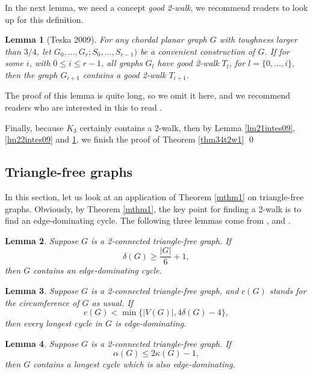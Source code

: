 \documentclass[12pt]{report}
\newtheorem{lemma}{Lemma}
\begin{document}
In the next lemma, we need a concept {\em good 2-walk}, we recommend readers to look up \cite[Lemma 2.2 and 2.3]{teska20092} for this definition.
\begin{lemma}[Teska 2009]\label{lm23intes09}
For any chordal planar graph $G$ with toughness larger than $3/4$, let $G_0,\ldots,G_r;S_0,\ldots,S_{r-1})$ be a  convenient construction of $G$. If for some $i$, with $0\le i\le r-1$, all graphs $G_l$ have good 2-walk $T_l$, for $l=\{0,\ldots,i\}$, then the graph $G_{i+1}$ contains a good 2-walk $T_{i+1}$. 
\end{lemma}
The proof of this lemma is quite long, so we omit it here, and we recommend readers who are interested in this to read \cite{teska20092}.

Finally, because $K_3$ certainly contains a 2-walk, then by Lemma \ref{lm21intes09}, \ref{lm22intes09} and \ref{lm23intes09}, we finish the proof of Theorem \ref{thm34t2w1}
\qed

\subsection{Triangle-free graphs}
In this section, let us look at an application of Theorem \ref{mthm1} on triangle-free graphs. Obviously, by Theorem \ref{mthm1}, the key point for finding a 2-walk is to find an edge-dominating cycle. The following three lemmas come from \cite{aung1989longest}, \cite{bauer2008long} and \cite{ozeki2011dominating}.


\begin{lemma}\cite[Corollary 1.4]{aung1989longest}\label{lmflcitfg1th}
Suppose $G$ is a 2-connected triangle-free graph. If $$\delta(G)\ge\frac{|G|}{6}+1,$$ then $G$ contains an edge-dominating cycle.
\end{lemma}

\begin{lemma}\cite[Theorem 1.7]{bauer2008long}\label{lmt17lci2tfg}
Suppose $G$ is a 2-connected triangle-free graph, and $c(G)$ stands for the circumference of $G$ as usual. If $$c(G)<\min\{|V(G)|,4\delta(G)-4\},$$ then every longest cycle in $G$ is edge-dominating.
\end{lemma}


\begin{lemma}\cite[Theorem 6]{ozeki2011dominating}\label{lmth6indcitfg1}
Suppose $G$ is a 2-connected triangle-free graph. If $$\alpha(G)\le2\kappa(G)-1,$$ then $G$ contains a longest cycle which is also edge-dominating.
\end{lemma}
\end{document}
